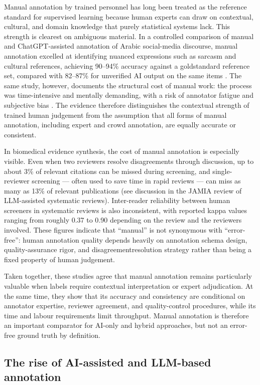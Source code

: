 \documentclass[acmsmall,nonacm]{acmart}
\begin{document}
Manual annotation by trained personnel has long been treated as the reference standard for supervised learning because human experts can draw on contextual, cultural, and domain knowledge that purely statistical systems lack. This strength is clearest on ambiguous material. In a controlled comparison of manual and ChatGPT-assisted annotation of Arabic social-media discourse, manual annotation excelled at identifying nuanced expressions such as sarcasm and cultural references, achieving 90--94\% accuracy against a goldstandard reference set, compared with 82--87\% for unverified AI output on the same items \citep{alathba2026cohesion}. The same study, however, documents the structural cost of manual work: the process was time-intensive and mentally demanding, with a risk of annotator fatigue and subjective bias \citep{alathba2026cohesion}. The evidence therefore distinguishes the contextual strength of trained human judgement from the assumption that all forms of manual annotation, including expert and crowd annotation, are equally accurate or consistent.

In biomedical evidence synthesis, the cost of manual annotation is especially visible. Even when two reviewers resolve disagreements through discussion, up to about 3\% of relevant citations can be missed during screening, and single-reviewer screening --- often used to save time in rapid reviews --- can miss as many as 13\% of relevant publications (see discussion in the JAMIA review of LLM-assisted systematic reviews). Inter-reader reliability between human screeners in systematic reviews is also inconsistent, with reported kappa values ranging from roughly 0.37 to 0.90 depending on the review and the reviewers involved. These figures indicate that ``manual'' is not synonymous with ``error-free'': human annotation quality depends heavily on annotation schema design, quality-assurance rigor, and disagreementresolution strategy rather than being a fixed property of human judgement.

Taken together, these studies agree that manual annotation remains particularly valuable when labels require contextual interpretation or expert adjudication. At the same time, they show that its accuracy and consistency are conditional on annotator expertise, reviewer agreement, and quality-control procedures, while its time and labour requirements limit throughput. Manual annotation is therefore an important comparator for AI-only and hybrid approaches, but not an error-free ground truth by definition.

\subsection{The rise of AI-assisted and LLM-based annotation}
\label{subsec:ai-assisted-annotation}
\end{document}
